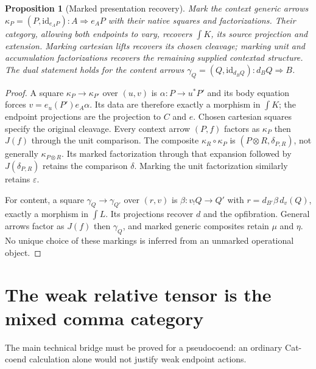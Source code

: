 \documentclass[11pt]{article}
\newtheorem{proposition}[theorem]{Proposition}
\theoremstyle{definition}
\newcommand{\id}{\mathrm{id}}
\begin{document}
\begin{proposition}[Marked presentation recovery]\label{prop:marked}
Mark the context generic arrows
$\kappa_P=(P,\id_{e_AP}):A\Rightarrow e_AP$ with their native squares and
factorizations. Their category, allowing both endpoints to vary, recovers
$\int K$, its source projection and extension. Marking cartesian lifts
recovers its chosen cleavage; marking unit and accumulation factorizations
recovers the remaining supplied contextad structure. The dual statement
holds for the content arrows
$\gamma_Q=(Q,\id_{d_BQ}):d_BQ\Rightarrow B$.
\end{proposition}
\begin{proof}
A square $\kappa_P\to\kappa_{P'}$ over $(u,v)$ is
$\alpha:P\to u^*P'$ and its body equation forces
$v=e_u(P')e_A\alpha$. Its data are therefore exactly a morphism in $\int K$;
the endpoint projections are the projection to $C$ and $e$. Chosen
cartesian squares specify the original cleavage. Every context arrow
$(P,f)$ factors as $\kappa_P$ then $J(f)$ through the unit comparison.
The composite $\kappa_R\circ\kappa_P$ is $(P\otimes R,\delta_{P,R})$,
not generally $\kappa_{P\otimes R}$. Its marked factorization through that
expansion followed by $J(\delta_{P,R})$ retains the comparison $\delta$.
Marking the unit factorization similarly retains $\varepsilon$.

For content, a square $\gamma_Q\to\gamma_{Q'}$ over $(r,v)$ is
$\beta:v_!Q\to Q'$ with $r=d_{B'}\beta\,d_v(Q)$, exactly a morphism in
$\int L$. Its projections recover $d$ and the opfibration. General arrows
factor as $J(f)$ then $\gamma_Q$, and marked generic composites retain
$\mu$ and $\eta$. No unique choice of these markings is inferred from an
unmarked operational object.
\end{proof}

\section{The weak relative tensor is the mixed comma category}\label{sec:bridge}

The main technical bridge must be proved for a pseudocoend: an ordinary
Cat-coend calculation alone would not justify weak endpoint actions.
\end{document}
